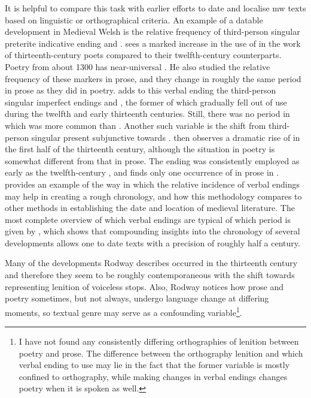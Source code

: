 It is helpful to compare this task with earlier efforts to date and localise \gls{mw} texts based on linguistic or orthographical criteria. An example of a datable development in Medieval Welsh is the relative frequency of third-person singular preterite indicative ending  and . \Textcite{Rod_Datable98} sees a marked increase in the use of  in the work of thirteenth-century poets compared to their twelfth-century counterparts. Poetry from about 1300 has near-universal . He also studied the relative frequency of these markers in prose, and they change in roughly the same period in prose as they did in poetry. \Textcite[68--71]{Rod_Two03} adds to this verbal ending the third-person singular imperfect endings  and \ei, the former of which gradually fell out of use during the twelfth and early thirteenth centuries. Still, there was no period in which  was more common than \ei. Another such variable is the shift from third-person singular present subjunctive  towards . \Textcite[71--73]{Rod_Two03} then observes a dramatic rise of  in the first half of the thirteenth century, although the situation in poetry is somewhat different from that in prose. The ending  was consistently employed as early as the twelfth-century , and \textcite[73]{Rod_Two03} finds only one occurrence of  in prose in . \Textcite{Rod_Where07} provides an example of the way in which the relative incidence of verbal endings may help in creating a rough chronology, and how this methodology compares to other methods in establishing the date and location of medieval literature. The most complete overview of which verbal endings are typical of which period is given by \textcite[166]{rodway_dating_2013}, which shows that compounding insights into the chronology of several developments allows one to date texts with a precision of roughly half a century.

Many of the developments Rodway describes occurred in the thirteenth century and therefore they seem to be roughly contemporaneous with the shift towards representing lenition of voiceless stops. Also, Rodway notices how prose and poetry sometimes, but not always, undergo language change at differing moments, so textual genre may serve as a confounding variable\footnote{I have not found any consistently differing orthographies of lenition between poetry and prose. The difference between the orthography lenition and which verbal ending to use may lie in the fact that the former variable is mostly confined to orthography, while making changes in verbal endings changes poetry when it is spoken as well.}.

